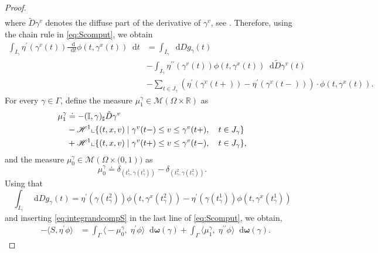 \documentclass[11pt, twoside, reqno]{amsart}
\theoremstyle{definition}
\theoremstyle{remark}
\numberwithin{equation}{section}
\newcommand*\dif{\mathop{}\!\mathrm{d}}
\newcommand{\second}{{\prime \prime}}
\newcommand{\bs}[1]{\boldsymbol{#1}}
\newcommand{\msc}[1]{\mathscr{#1}}
\newcommand{\wt}[1]{\widetilde{#1}}
\begin{document}
\begin{proof}
$$\begin{aligned}
\end{aligned}
$$
where $\wt D\gamma^v$ denotes the diffuse part of the derivative of $\gamma^v$, see \cite[\S 3.9]{AFP_book}.
Therefore, using the chain rule in \eqref{eq:Scomput}, we obtain 
\begin{equation}\label{eq:integrandcompS}
    \begin{aligned}
    \int_{I_{\gamma}} \eta^{\prime}(\gamma^v(t)) \frac{\dif}{\dif t} \phi(t, \gamma^x(t)) \dif t & = \int_{I_{\gamma}} \dif D g_{\gamma}(t) \\
  & -\int_{I_{\gamma}} \eta^{\second}(\gamma^v(t)) \phi(t, \gamma^x(t)) \dif \wt D \gamma^v(t)\\ 
  & - \sum_{t\in J_\gamma} (\eta^{\prime}(\gamma^v(t+))-\eta^{\prime}(\gamma^v(t-))) \cdot \phi(t, \gamma^x(t)).
    \end{aligned}
\end{equation}
For every $\gamma \in \Gamma$, define the measure $\mu_1^{\gamma} \in \msc M(\Omega \times \mathbb R)$ as 
\begin{equation}\label{eq:mu1def}
    \begin{aligned}
    \mu_1^{\gamma}& \doteq -(\mathbb I , \gamma)_{\sharp} \Tilde{D} \gamma^v \\
    & - \mathscr H^1 \llcorner \{(t,x,v) \; | \; \gamma^v(t-) \leq v \leq \gamma^v(t+), \quad t \in J_\gamma\}\\
    & +\mathscr H^1 \llcorner \{(t,x,v) \; | \; \gamma^v(t+) \leq v \leq \gamma^v(t-), \quad t \in J_\gamma\},
    \end{aligned}
 \end{equation}
and the measure $\mu_0^{\gamma}\in \msc M(\Omega \times \mathbb (0,1))$ as
\begin{equation}\label{eq:mu0def}
 \mu_0^{\gamma} \doteq \delta_{(t^1_{\gamma}, \gamma(t^1_{\gamma}))} - \delta_{(t^2_{\gamma}, \gamma(t^2_{\gamma}))}.
\end{equation}
Using that 
$$
\int_{I_\gamma} \dif D g_\gamma(t) = \eta^\prime(\gamma(t_\gamma^2)) \phi(t, \gamma^x(t_\gamma^2))-  \eta^\prime(\gamma(t_\gamma^1)) \phi(t, \gamma^x(t_\gamma^1))
$$
and inserting \eqref{eq:integrandcompS} in the last line of \eqref{eq:Scomput}, we obtain, 
\begin{equation}
    \begin{aligned}
   & -\big\langle S, \eta^{\prime} \phi\big\rangle & =  \int_{\Gamma} \big\langle -\mu^{\gamma}_0, \; \eta^{\prime} \phi\big\rangle \dif \bs \omega(\gamma)  + \int_{\Gamma} \big\langle \mu^{\gamma}_1, \; \eta^{\second} \phi\big\rangle \dif \bs \omega(\gamma).

\end{aligned}
\end{equation}
\end{proof}
\end{document}
